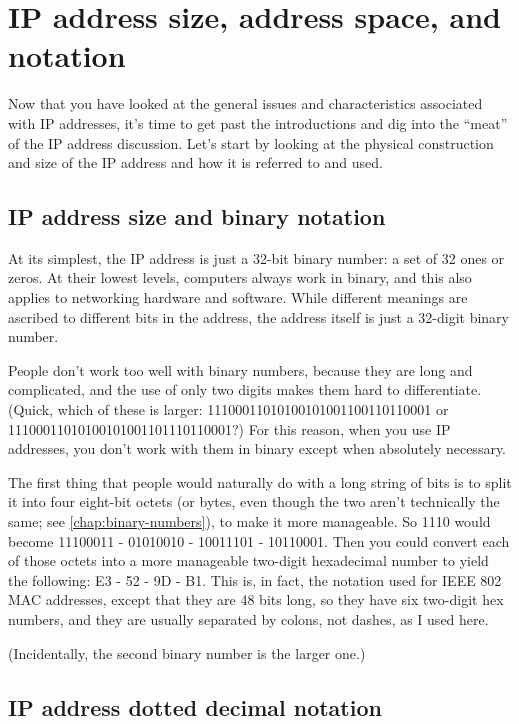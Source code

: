 \section{IP address size, address space, and notation}

Now that you have looked at the general issues and characteristics
associated with IP addresses, it's time to get past the introductions
and dig into the ``meat'' of the IP address discussion.
Let's start by looking at the physical construction and size of the IP address and how it is referred to and used.


\subsection{IP address size and binary notation}

At its simplest, the IP address is just a 32-bit binary number: a set of 32 ones or zeros. At their lowest levels, computers always work in binary,
and this also applies to networking hardware and software. While
different meanings are ascribed to different bits in the address, the
address itself is just a 32-digit binary number.

People don't work too well with binary numbers, because they are long
and complicated, and the use of only two digits makes them hard to
differentiate. (Quick, which of these is larger:
11100011010100101001100110110001 or 11100011010100101001101110110001?)
For this reason, when you use IP addresses, you don't work with them in
binary except when absolutely necessary.

The first thing that people would naturally do with a long string of bits is to split it into four eight-bit octets (or bytes, even though
the two aren't technically the same; see \vref{chap:binary-numbers}), to make it more manageable.
So 1110 would become 11100011 - 01010010 -
10011101 - 10110001. Then you could convert each of those octets into a
more manageable two-digit hexadecimal number to yield the following: E3
- 52 - 9D - B1. This is, in fact, the notation used for IEEE 802 MAC
addresses, except that they are 48 bits long, so they have six two-digit
hex numbers, and they are usually separated by colons, not dashes, as I
used here.

(Incidentally, the second binary number is the larger one.)



\subsection{IP address dotted decimal notation}

